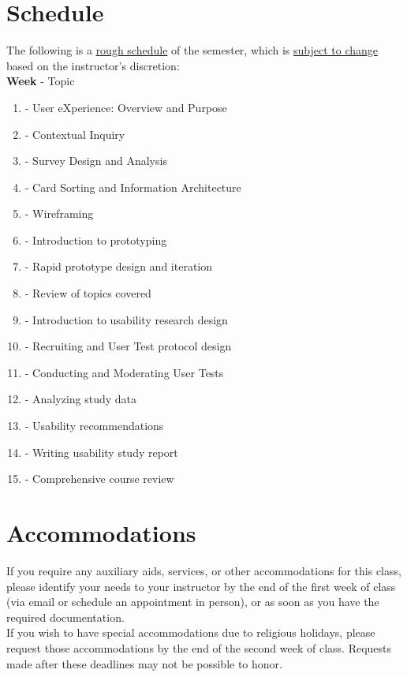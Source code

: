 \documentclass[12pt]{article}
\begin{document}
  \section*{Schedule}
  \noindent
  The following is a \underline{rough schedule} of the semester, which is \underline{subject to change} based on the instructor's discretion: \\
  \newline
  \textbf{Week} - Topic 
  \begin{enumerate}
    \item - User eXperience: Overview and Purpose
    \item - Contextual Inquiry
    \item - Survey Design and Analysis
    \item - Card Sorting and Information Architecture
    \item - Wireframing
    \item - Introduction to prototyping
    \item - Rapid prototype design and iteration
    \item - Review of topics covered
    \item - Introduction to usability research design
    \item - Recruiting and User Test protocol design
    \item - Conducting and Moderating User Tests
    \item - Analyzing study data
    \item - Usability recommendations
    \item - Writing usability study report
    \item - Comprehensive course review
  \end{enumerate}

  \section*{Accommodations}
  \noindent
  If you require any auxiliary aids, services, or other accommodations for this class, please identify your needs to your instructor by the end of the first week of class (via email or schedule an appointment in person), or as soon as you have the required documentation.\\ 
  If you wish to have special accommodations due to religious holidays, please request those accommodations by the end of the second week of class. Requests made after these deadlines may not be possible to honor. 
\end{document}
